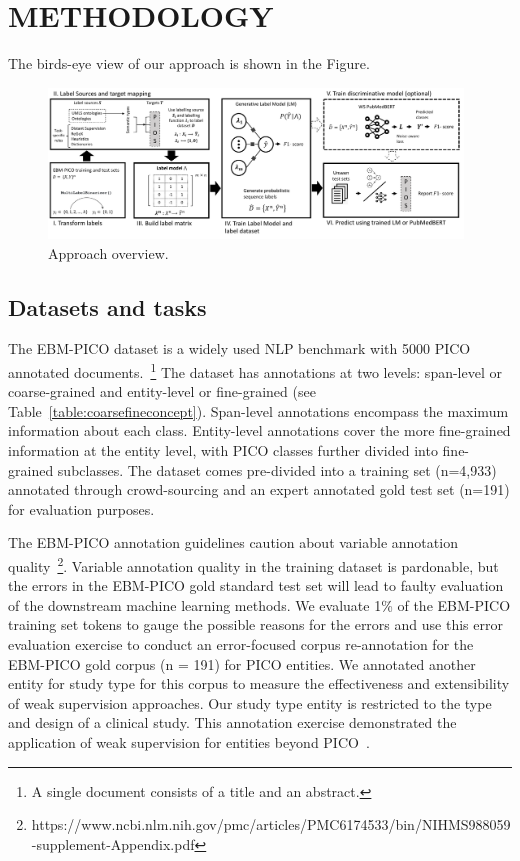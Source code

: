 \documentclass[10.7pt,]{article}
\begin{document}
\section{METHODOLOGY}\label{methods}
%
The birds-eye view of our approach is shown in the Figure.

\begin{figure}[t]
\centering
\includegraphics[width=0.98\textwidth]{figures/approach.pdf}
\caption{Approach overview.}
\label{fig:approach}
\end{figure}
%
%
%
\subsection{Datasets and tasks}\label{data}
%
The EBM-PICO dataset is a widely used NLP benchmark with 5000 PICO annotated documents.~\footnote{A single document consists of a title and an abstract.}
The dataset has annotations at two levels: span-level or coarse-grained and entity-level or fine-grained (see Table~\ref{table:coarsefineconcept}).
Span-level annotations encompass the maximum information about each class.
Entity-level annotations cover the more fine-grained information at the entity level, with PICO classes further divided into fine-grained subclasses.
The dataset comes pre-divided into a training set (n=4,933) annotated through crowd-sourcing and an expert annotated gold test set (n=191) for evaluation purposes.


The EBM-PICO annotation guidelines caution about variable annotation quality~\footnote{https://www.ncbi.nlm.nih.gov/pmc/articles/PMC6174533/bin/NIHMS988059-supplement-Appendix.pdf}.
Variable annotation quality in the training dataset is pardonable, but the errors in the EBM-PICO gold standard test set will lead to faulty evaluation of the downstream machine learning methods.
We evaluate 1\% of the EBM-PICO training set tokens to gauge the possible reasons for the errors and use this error evaluation exercise to conduct an error-focused corpus re-annotation for the EBM-PICO gold corpus (n = 191) for PICO entities.
We annotated another entity for study type for this corpus to measure the effectiveness and extensibility of weak supervision approaches.
Our study type entity is restricted to the type and design of a clinical study.
This annotation exercise demonstrated the application of weak supervision for entities beyond PICO~\cite{menard2019turning}.
\end{document}
